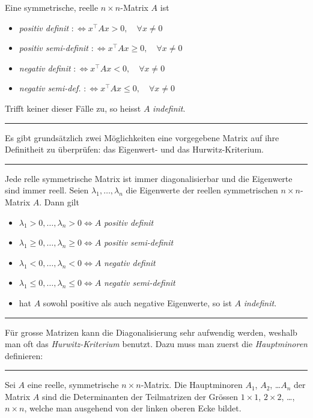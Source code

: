 \documentclass[a4paper,landscape,8pt]{extarticle}
\newcommand{\sep}{\vspace{5pt}\noindent\hrule\vspace{5pt}}
\begin{document}
\begin{multicols*}{4}
\Def Eine symmetrische, reelle $n\times n$-Matrix $A$ ist

\begin{itemize}
  \item \emph{positiv definit} 
  $:\Longleftrightarrow x^\top Ax > 0, \quad \forall x \neq 0$
  \item \emph{positiv semi-definit}
  $:\Longleftrightarrow x^\top Ax \geq 0, \quad \forall x \neq 0$
  \item \emph{negativ definit}  
  $:\Longleftrightarrow x^\top Ax < 0, \quad \forall x \neq 0$
  \item \emph{negativ semi-def.} 
  $:\Longleftrightarrow x^\top Ax \leq 0, \quad \forall x \neq 0$
\end{itemize}

Trifft keiner dieser Fälle zu, so heisst $A$ \emph{indefinit}.

\sep

Es gibt grundsätzlich zwei Möglichkeiten eine vorgegebene Matrix auf ihre
Definitheit zu überprüfen: das Eigenwert- und das Hurwitz-Kriterium.

\sep

 Jede relle symmetrische Matrix ist immer
diagonalisierbar und die Eigenwerte sind immer reell. Seien 
$\lambda_1,\ldots,\lambda_n$ die Eigenwerte
der reellen symmetrischen $n\times n$-Matrix $A$. Dann gilt
\begin{itemize}
  \item $\lambda_1>0,\ldots,\lambda_n>0 \Longleftrightarrow	A$
  \emph{positiv definit}
  \item $\lambda_1\geq 0,\ldots,\lambda_n\geq 0 \Longleftrightarrow	A$
  \emph{positiv semi-definit}
  \item $\lambda_1<0,\ldots,\lambda_n<0 \Longleftrightarrow	A$
  \emph{negativ definit}
  \item $\lambda_1\leq 0,\ldots,\lambda_n\leq 0 \Longleftrightarrow	A$
  \emph{negativ semi-definit}
  \item hat $A$ sowohl positive als auch negative Eigenwerte, so ist $A$
  \emph{indefinit}.
\end{itemize}

\sep

Für grosse Matrizen kann die Diagonalisierung sehr aufwendig werden, weshalb man
oft das \emph{Hurwitz-Kriterium} benutzt. Dazu muss man zuerst die
\emph{Hauptminoren} definieren:

\sep

\Def Sei $A$ eine reelle, symmetrische $n\times n$-Matrix. Die Hauptminoren
$A_1$, $A_2$, \ldots $A_n$ der Matrix $A$ sind die Determinanten der
Teilmatrizen der Grössen $1\times 1$, $2\times 2$, \ldots, $n\times n$, welche
man ausgehend von der linken oberen Ecke bildet. 


\end{multicols*}
\end{document}
